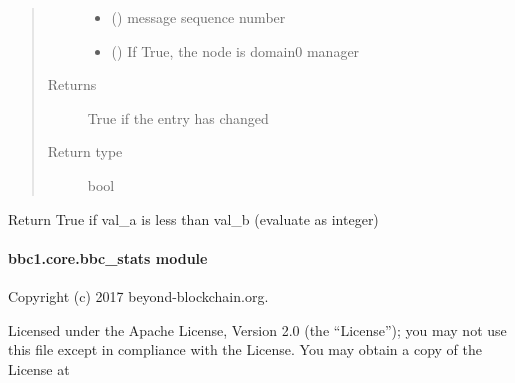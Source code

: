 \documentclass[letterpaper,10pt,english]{sphinxmanual}
\begin{document}
\begin{fulllineitems}
\begin{fulllineitems}
\begin{quote}
\begin{description}
\begin{itemize}
\item {} 
 () \textendash{} message sequence number

\item {} 
 () \textendash{} If True, the node is domain0 manager

\end{itemize}

\item[{Returns}] \leavevmode
True if the entry has changed

\item[{Return type}] \leavevmode
bool

\end{description}\end{quote}

\end{fulllineitems}


\end{fulllineitems}


\begin{fulllineitems}
\label{\detokenize{bbc1.core.bbc_network:bbc1.core.bbc_network.is_less_than}}
Return True if val\_a is less than val\_b (evaluate as integer)

\end{fulllineitems}



\paragraph{bbc1.core.bbc\_stats module}
\label{\detokenize{bbc1.core.bbc_stats:module-bbc1.core.bbc_stats}}\label{\detokenize{bbc1.core.bbc_stats:bbc1-core-bbc-stats-module}}\label{\detokenize{bbc1.core.bbc_stats::doc}}
Copyright (c) 2017 beyond-blockchain.org.

Licensed under the Apache License, Version 2.0 (the “License”);
you may not use this file except in compliance with the License.
You may obtain a copy of the License at
\begin{quote}

\end{quote}
\end{document}
